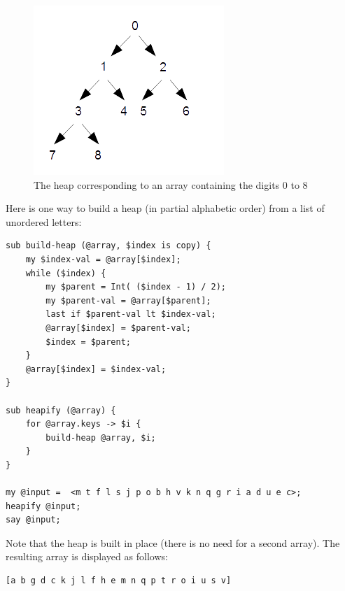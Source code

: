 \begin{figure}
\centerline
{\includegraphics[scale=1]{figs/figure_heap.png}}
\caption{The heap corresponding to an array containing the digits 0 to 8}
\label{fig.heap}
\end{figure}

Here is one way to build a heap (in partial alphabetic order) 
from a list of unordered letters:

\begin{verbatim}
sub build-heap (@array, $index is copy) {
    my $index-val = @array[$index];
    while ($index) {
        my $parent = Int( ($index - 1) / 2);
        my $parent-val = @array[$parent];
        last if $parent-val lt $index-val;
        @array[$index] = $parent-val;
        $index = $parent;
    }
    @array[$index] = $index-val;
}

sub heapify (@array) {
    for @array.keys -> $i {
        build-heap @array, $i;
    }
}

my @input =  <m t f l s j p o b h v k n q g r i a d u e c>; 
heapify @input;
say @input;
\end{verbatim}

Note that the heap is built in place (there is no 
need for a second array). The resulting array is 
displayed as follows:
\begin{verbatim}
[a b g d c k j l f h e m n q p t r o i u s v]
\end{verbatim}

